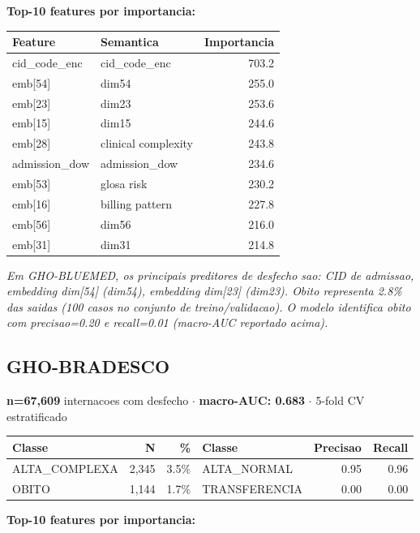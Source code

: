 \documentclass[11pt,a4paper]{article}
\begin{document}
\vspace{4pt}\noindent\textbf{Top-10 features por importancia:}

\begin{tabular}{llr}
\toprule
Feature & Semantica & Importancia \\
\midrule
cid\_code\_enc & cid\_code\_enc & 703.2 \\
emb[54] & dim54 & 255.0 \\
emb[23] & dim23 & 253.6 \\
emb[15] & dim15 & 244.6 \\
emb[28] & clinical complexity & 243.8 \\
admission\_dow & admission\_dow & 234.6 \\
emb[53] & glosa risk & 230.2 \\
emb[16] & billing pattern & 227.8 \\
emb[56] & dim56 & 216.0 \\
emb[31] & dim31 & 214.8 \\
\bottomrule
\end{tabular}

\vspace{4pt}\noindent\textit{Em GHO-BLUEMED, os principais preditores de desfecho sao: CID de admissao, embedding dim[54] (dim54), embedding dim[23] (dim23). Obito representa 2.8\% das saidas (100 casos no conjunto de treino/validacao). O modelo identifica obito com precisao=0.20 e recall=0.01 (macro-AUC reportado acima).}

\subsection{GHO-BRADESCO}
\textbf{n=67,609} internacoes com desfecho $\cdot$ \textbf{macro-AUC: 0.683} $\cdot$ 5-fold CV estratificado

\begin{tabular}{lrr|lrr}
\toprule
Classe & N & \% & Classe & Precisao & Recall \\
\midrule
ALTA\_COMPLEXA & 2,345 & 3.5\% & ALTA\_NORMAL & 0.95 & 0.96 \\
OBITO & 1,144 & 1.7\% & TRANSFERENCIA & 0.00 & 0.00 \\
\bottomrule
\end{tabular}

\vspace{4pt}\noindent\textbf{Top-10 features por importancia:}
\end{document}
